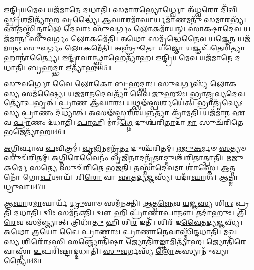 \-\ul{𑌇}\-\-\ul{𑌨𑍍𑌦𑍍𑌰𑌿}\-𑌯\-\ul{𑌮𑍇}\-𑌵 𑌯𑌜᳴𑌮𑌾𑌨𑍇 𑌦𑌧𑌾𑌤𑌿।
\-\ul{𑌸}\-\-\ul{𑌮𑌾}\-𑌰\-\ul{𑌭𑍍𑌯𑍋}\-𑌰𑍍𑌧𑍍𑌵𑍋 𑌅᳴\-\ul{𑌧𑍍𑌵}\-𑌰𑍋 𑌦𑌿᳴\-\ul{𑌵𑌿}\-𑌸𑍍𑌪𑍃\-\ul{𑌶}\-𑌮𑌿𑌤𑍍𑌯𑌾᳴\-\ul{𑌹} 𑌵𑍃𑌦𑍍𑌧𑍍𑌯𑍈॑।
\-\ul{𑌆}\-\-\ul{𑌘𑌾}\-𑌰𑌮𑌾᳴\-\ul{𑌘𑌾}\-𑌰𑍍𑌯𑌮𑌾᳴\-\ul{𑌣}\-𑌮𑌨𑍁᳴ 𑌸\-\ul{𑌮𑌾}\-𑌰𑌭𑍍𑌯᳴।
\-\ul{𑌏}\-𑌤𑌸𑍍𑌮𑌿᳴\-\ul{𑌨𑍍𑌕𑌾}\-𑌲𑍇 \ul{𑌦𑍇}\-𑌵𑌾𑌃 𑌸𑍁᳴\-\ul{𑌵}\-𑌰𑍍𑌗𑌂 \ul{𑌲𑍋}\-𑌕𑌮𑌾᳴𑌯𑌨𑍍।
\-\ul{𑌸𑌾}\-𑌕𑍍𑌷𑌾\-\ul{𑌦𑍇}\-𑌵 𑌯𑌜᳴𑌮𑌾𑌨𑌃 𑌸𑍁\-\ul{𑌵}\-𑌰𑍍𑌗𑌂 \ul{𑌲𑍋}\-𑌕𑌮𑍇᳴𑌤𑌿।
𑌅\-\ul{𑌥𑍋} 𑌸𑌮𑍃᳴𑌦𑍍𑌧𑍇\-\ul{𑌨𑍈}\-𑌵 \ul{𑌯}\-𑌜𑍍𑌞𑍇\-\ul{𑌨} 𑌯𑌜᳴𑌮𑌾𑌨𑌃 𑌸𑍁\-\ul{𑌵}\-𑌰𑍍𑌗𑌂 \ul{𑌲𑍋}\-𑌕𑌮𑍇᳴𑌤𑌿।
𑌅𑌹𑍍𑌰𑍁᳴𑌤𑍋 \ul{𑌯}\-𑌜𑍍𑌞𑍋 \ul{𑌯}\-𑌜𑍍𑌞𑌪᳴\-\ul{𑌤𑍇}\-𑌰𑌿\-\ul{𑌤𑍍𑌯𑌾}\-𑌹𑌾𑌨𑌾॑𑌰𑍍𑌤𑍍𑌯𑍈।
𑌇𑌨𑍍𑌦𑍍𑌰𑌾᳴\-\ul{𑌵𑌾}\-𑌨𑍍𑌥𑍍𑌸𑍍𑌵𑌾𑌹𑍇𑌤𑍍𑌯𑌾᳴𑌹।
\-\ul{𑌇}\-\-\ul{𑌨𑍍𑌦𑍍𑌰𑌿}\-𑌯\-\ul{𑌮𑍇}\-𑌵 𑌯𑌜᳴𑌮𑌾𑌨𑍇 𑌦𑌧𑌾𑌤𑌿।
\-\ul{𑌬𑍃}\-𑌹𑌦𑍍𑌭𑌾 𑌇𑌤𑍍𑌯𑌾᳴𑌹॥45॥

\-\ul{𑌸𑍁}\-\-\ul{𑌵}\-𑌰𑍍𑌗𑍋 𑌵𑍈 \ul{𑌲𑍋}\-𑌕𑍋 \ul{𑌬𑍃}\-𑌹𑌦𑍍𑌭𑌾𑌃।
\-\ul{𑌸𑍁}\-\-\ul{𑌵}\-𑌰𑍍𑌗𑌸𑍍𑌯᳴ \ul{𑌲𑍋}\-𑌕\-\ul{𑌸𑍍𑌯} 𑌸𑌮᳴𑌷𑍍𑌟𑍍𑌯𑍈।
\-\ul{𑌯}\-\-\ul{𑌜}\-\-\ul{𑌮𑌾}\-\-\ul{𑌨}\-\-\ul{𑌦𑍇}\-\-\ul{𑌵}\-𑌤𑍍𑌯𑌾᳴ 𑌵𑍈 \ul{𑌜𑍁}\-𑌹𑍂𑌃।
\-\ul{𑌭𑍍𑌰𑌾}\-\-\ul{𑌤𑍃}\-\-\ul{𑌵𑍍𑌯}\-\-\ul{𑌦𑍇}\-\-\ul{𑌵}\-𑌤𑍍𑌯𑍋᳴\-\ul{𑌪}\-𑌭𑍃𑌤𑍍।
\-\ul{𑌪𑍍𑌰𑌾}\-𑌣 𑌆᳴\-\ul{𑌘𑌾}\-𑌰𑌃।
𑌯𑌥𑍍𑌸𑍟᳴\-\ul{𑌸𑍍𑌪}\-\-\ul{𑌰𑍍}\-𑌶𑌯𑍇॑𑌤𑍍।
𑌭𑍍𑌰𑌾𑌤𑍃᳴𑌵𑍍𑌯𑍇𑌽𑌸𑍍𑌯 \ul{𑌪𑍍𑌰𑌾}\-𑌣𑌂 𑌦᳴𑌧𑍍𑌯𑌾𑌤𑍍।
𑌅𑌸𑍟᳴𑌸𑍍𑌪𑌰𑍍‌\mbox{}𑌶𑌯\-\ul{𑌨𑍍𑌨}\-𑌤𑍍𑌯𑌾 𑌕𑍍𑌰𑌾᳴𑌮𑌤𑌿।
𑌯𑌜᳴𑌮𑌾𑌨 \ul{𑌏}\-𑌵 \ul{𑌪𑍍𑌰𑌾}\-𑌣𑌂 𑌦᳴𑌧𑌾𑌤𑌿।
\-\ul{𑌪𑌾}\-𑌹𑌿 𑌮𑌾॑\-𑌽\-\ul{𑌗𑍍𑌨𑍇} 𑌦𑍁𑌶𑍍𑌚᳴𑌰𑌿\-\ul{𑌤𑌾}\-𑌦𑌾 \ul{𑌮𑌾} 𑌸𑍁𑌚᳴𑌰𑌿𑌤𑍇 \ul{𑌭}\-𑌜𑍇𑌤𑍍𑌯𑌾᳴𑌹॥46॥

\-\ul{𑌅}\-𑌗𑍍𑌨𑌿𑌰𑍍𑌵𑌾𑌵 \ul{𑌪}\-𑌵𑌿𑌤𑍍𑌰𑌮𑍍॑।
\-\ul{𑌵𑍃}\-\-\ul{𑌜𑌿}\-𑌨𑌮𑌨𑍃᳴\-\ul{𑌤𑌂} 𑌦𑍁𑌶𑍍𑌚᳴𑌰𑌿𑌤𑌮𑍍।
\-\ul{𑌋}\-\-\ul{𑌜𑍁}\-\-\ul{𑌕}\-𑌰𑍍𑌮𑍞 \ul{𑌸}\-𑌤𑍍𑌯𑍞 𑌸𑍁𑌚᳴𑌰𑌿𑌤𑌮𑍍।
\-\ul{𑌅}\-𑌗𑍍𑌨𑌿\-\ul{𑌰𑍇}\-𑌵𑍈𑌨𑌂᳴ 𑌵𑍃\-\ul{𑌜𑌿}\-𑌨𑌾𑌦𑌨𑍃᳴\-\ul{𑌤𑌾}\-𑌦𑍍𑌦𑍁𑌶𑍍𑌚᳴𑌰𑌿𑌤𑌾𑌤𑍍𑌪𑌾𑌤𑌿।
\-\ul{𑌋}\-\-\ul{𑌜𑍁}\-\-\ul{𑌕}\-𑌰𑍍𑌮𑍇 \ul{𑌸}\-𑌤𑍍𑌯𑍇 𑌸𑍁𑌚᳴𑌰𑌿𑌤𑍇 𑌭𑌜𑌤𑌿।
𑌤𑌸𑍍𑌮𑌾᳴\-\ul{𑌦𑍇}\-𑌵𑌮𑌾 𑌶𑌾॑𑌸𑍍𑌤𑍇।
\-\ul{𑌆}\-𑌤𑍍𑌮𑌨𑍋᳴ 𑌗𑍋\-\ul{𑌪𑍀}\-𑌥𑌾𑌯᳴।
𑌶𑌿\-\ul{𑌰𑍋} 𑌵𑌾 \ul{𑌏}\-𑌤\-\ul{𑌦𑍍𑌯}\-𑌜𑍍𑌞𑌸𑍍𑌯᳴।
𑌯𑌦𑌾᳴\-\ul{𑌘𑌾}\-𑌰𑌃।
\-\ul{𑌆}\-𑌤𑍍𑌮𑌾 \ul{𑌧𑍍𑌰𑍁}\-𑌵𑌾॥47॥

\-\ul{𑌆}\-\-\ul{𑌘𑌾}\-𑌰\-\ul{𑌮𑌾}\-𑌘𑌾𑌰𑍍𑌯᳴ \ul{𑌧𑍍𑌰𑍁}\-𑌵𑌾𑍞 𑌸𑌮᳴𑌨𑌕𑍍𑌤𑌿।
\-\ul{𑌆}\-𑌤𑍍𑌮\-\ul{𑌨𑍍𑌨𑍇}\-𑌵 \ul{𑌯}\-𑌜𑍍𑌞\-\ul{𑌸𑍍𑌯} 𑌶𑌿\-\ul{𑌰𑌃} 𑌪𑍍𑌰𑌤𑌿᳴ 𑌦𑌧𑌾𑌤𑌿।
𑌦𑍍𑌵𑌿𑌃 𑌸𑌮᳴𑌨𑌕𑍍𑌤𑌿।
𑌦𑍍𑌵𑍗 𑌹𑌿 𑌪𑍍𑌰𑌾᳴𑌣𑌾\-\ul{𑌪𑌾}\-𑌨𑍗।
𑌤𑌦𑌾᳴𑌹𑍁𑌃।
𑌤𑍍𑌰𑌿\-\ul{𑌰𑍇}\-𑌵 𑌸𑌮᳴𑌞𑍍𑌜𑍍𑌯𑌾𑌤𑍍।
𑌤𑍍𑌰𑌿𑌧𑌾᳴\-\ul{𑌤𑍁} 𑌹𑌿 𑌶𑌿\-\ul{𑌰} 𑌇𑌤𑌿᳴।
𑌶𑌿𑌰᳴ 𑌇\-\ul{𑌵𑍈}\-𑌤\-\ul{𑌦𑍍𑌯}\-𑌜𑍍𑌞𑌸𑍍𑌯᳴।
𑌅\-\ul{𑌥𑍋} 𑌤𑍍𑌰\-\ul{𑌯𑍋} 𑌵𑍈 \ul{𑌪𑍍𑌰𑌾}\-𑌣𑌾𑌃।
\-\ul{𑌪𑍍𑌰𑌾}\-𑌣𑌾\-\ul{𑌨𑍇}\-𑌵𑌾𑌸𑍍𑌮𑌿᳴𑌨𑍍𑌦𑌧𑌾𑌤𑌿।
\-\ul{𑌮}\-𑌖\-\ul{𑌸𑍍𑌯} 𑌶𑌿𑌰𑍋᳴𑌽\-\ul{𑌸𑌿} 𑌸𑌞𑍍𑌜𑍍𑌯𑍋𑌤𑌿᳴\-\ul{𑌷𑌾} 𑌜𑍍𑌯𑍋𑌤𑌿᳴𑌰\-\ul{𑌙𑍍𑌕𑍍𑌤𑌾}\-𑌮𑌿𑌤𑍍𑌯𑌾᳴𑌹।
𑌜𑍍𑌯𑍋𑌤𑌿᳴\-\ul{𑌰𑍇}\-𑌵𑌾𑌸𑍍𑌮𑌾᳴ \ul{𑌉}\-𑌪𑌰𑌿᳴𑌷𑍍𑌟𑌾𑌦𑍍𑌦𑌧𑌾𑌤𑌿।
\-\ul{𑌸𑍁}\-\-\ul{𑌵}\-𑌰𑍍𑌗𑌸𑍍𑌯᳴ \ul{𑌲𑍋}\-𑌕𑌸𑍍𑌯𑌾𑌨𑍁᳴𑌖𑍍𑌯𑌾𑌤𑍍𑌯𑍈॥48॥\anuvakamend[𑌪𑌰𑌿᳴𑌦𑌧𑌾𑌤𑌿 \ul{𑌪𑍍𑌰𑌾}\-𑌣𑌂 𑌦᳴𑌧𑌾\-\ul{𑌤𑌿} 𑌹𑌿 \ul{𑌯}\-𑌜𑍍𑌞𑍋 𑌘𑌾᳴𑌰𑌯\-\ul{𑌤𑌿} 𑌨\-\ul{𑌮} 𑌇𑌤𑍍𑌯𑌾᳴𑌹 \ul{𑌪}\-𑌶𑍍𑌚𑌾\-\ul{𑌦𑍍𑌵𑍀}\-𑌰𑍍𑌯𑌾᳴𑌣𑍀𑌤𑍍𑌯𑌾᳴\-\ul{𑌹} 𑌭𑌾 𑌇𑌤𑍍𑌯𑌾᳴𑌹 \ul{𑌭}\-𑌜𑍇𑌤𑍍𑌯𑌾᳴𑌹 \ul{𑌧𑍍𑌰𑍁}\-𑌵𑍈𑌵𑌾𑌸𑍍𑌮𑌿᳴𑌨𑍍𑌦𑌧𑌾\-\ul{𑌤𑌿} 𑌤𑍍𑌰𑍀𑌣𑌿᳴ 𑌚]

